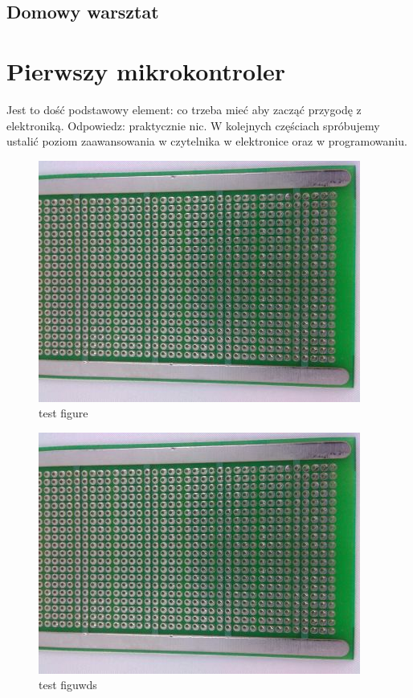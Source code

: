 \documentclass[a4paper,12pt, twoside]{article}
\let\oldsection\section		%
\renewcommand\section{\clearpage\oldsection}%
\begin{document}
	\subsection {Domowy warsztat}
    
       
        

\section{Pierwszy mikrokontroler}
		Jest to dość podstawowy element: co trzeba mieć aby zacząć przygodę z elektroniką. Odpowiedz: praktycznie nic. W kolejnych częściach spróbujemy ustalić poziom zaawansowania w czytelnika w elektronice oraz w programowaniu.
\begin{figure}[htb]
  \centering
  \includegraphics[scale=0.1,right]{universe.jpg}
  \caption{test figure}
  \label{fig:test}
\end{figure}
\begin{figure}[!h]
  \centering
  \includegraphics[scale=0.1,left]{universe.jpg}
  \caption{test figuwds}
  \label{fig:test}
\end{figure}
\end{document}

